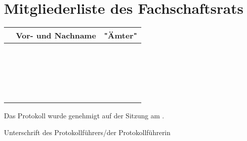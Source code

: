 \documentclass[sitzung=fsv-konstituierend]{fsphys-protokoll}
\begin{document}
\section{Mitgliederliste des Fachschaftsrats}
\setcounter{fsr}{0}
\begin{longtable}{| r @{ } l | >{\raggedright\arraybackslash}m{10cm} |}
	\hline
	& Vor- und Nachname & "Ämter"
	\\ \hline\hline
	\endhead
	\fsrnum & 
	&
	\\ \hline
	\fsrnum & 
	&
	\\ \hline
	\fsrnum & 
	&
	\\ \hline
	\fsrnum & 
	&
	\\ \hline
	\fsrnum & 
	&
	\\ \hline
	\fsrnum & 
	&
	\\ \hline
	\fsrnum & 
	&
	\\ \hline
	\fsrnum & 
	&
	\\ \hline
	\fsrnum & 
	&
	\\ \hline
	\fsrnum & 
	&
	\\ \hline
	\fsrnum & 
	&
	\\ \hline
	\fsrnum & 
	&
	\\ \hline
	\fsrnum & 
	&
	\\ \hline
	\fsrnum & 
	&
	\\ \hline
	\fsrnum & 
	&
	\\ \hline
	\fsrnum & 
	&
	\\ \hline
	\fsrnum & 
	&
	\\ \hline
	\fsrnum & 
	&
	\\ \hline
	\fsrnum & 
	&
	\\ \hline
	\fsrnum & 
	&
	\\ \hline
\end{longtable}

\bigskip
\bigskip
Das Protokoll wurde genehmigt auf der Sitzung am \protokollformatteddate.

\vspace{2cm}
Unterschrift des Protokollführers/der Protokollführerin
\end{document}
